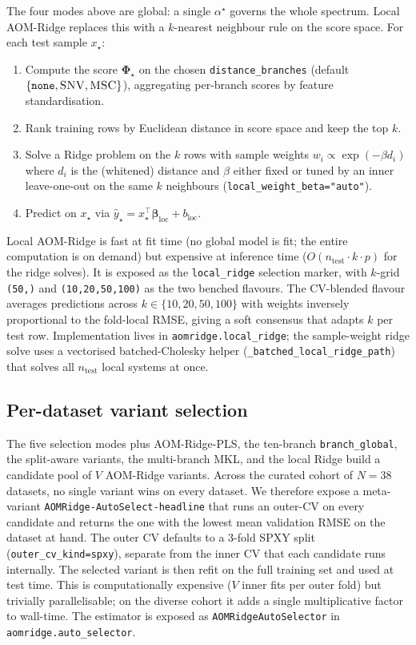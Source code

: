 \documentclass[11pt,a4paper]{article}
\newcommand{\Phimat}{\mathbf{\Phi}}
\newcommand{\SNV}{\textsc{SNV}\xspace}
\newcommand{\MSC}{\textsc{MSC}\xspace}
\begin{document}
The four modes above are global: a single $\alpha^\star$ governs the
whole spectrum. Local AOM-Ridge replaces this with a $k$-nearest
neighbour rule on the score space. For each test sample $x_\star$:
\begin{enumerate}[leftmargin=2em,itemsep=0pt]
  \item Compute the score $\Phimat_\star$ on the chosen
        \texttt{distance\_branches} (default
        $\{\texttt{none},\SNV,\MSC\}$), aggregating per-branch scores
        by feature standardisation.
  \item Rank training rows by Euclidean distance in score space and
        keep the top $k$.
  \item Solve a Ridge problem on the $k$ rows with sample weights
        $w_i\propto\exp(-\beta d_i)$ where $d_i$ is the (whitened)
        distance and $\beta$ either fixed or tuned by an inner
        leave-one-out on the same $k$ neighbours
        (\texttt{local\_weight\_beta="auto"}).
  \item Predict on $x_\star$ via
        $\hat{y}_\star=x_\star^\top\bm\beta_{\mathrm{loc}}+b_{\mathrm{loc}}$.
\end{enumerate}
Local AOM-Ridge is fast at fit time (no global model is fit; the
entire computation is on demand) but expensive at inference time
($O(n_\mathrm{test}\!\cdot\!k\!\cdot\!p)$ for the ridge solves). It
is exposed as the \texttt{local\_ridge} selection marker, with
$k$-grid \texttt{(50,)} and \texttt{(10,20,50,100)} as the two
benched flavours. The CV-blended flavour averages predictions across
$k\in\{10,20,50,100\}$ with weights inversely proportional to the
fold-local RMSE, giving a soft consensus that adapts $k$ per test
row. Implementation lives in \texttt{aomridge.local\_ridge}; the
sample-weight ridge solve uses a vectorised
batched-Cholesky helper (\texttt{\_batched\_local\_ridge\_path}) that
solves all $n_\mathrm{test}$ local systems at once.

\subsection{Per-dataset variant selection}\label{sec:method-autoselect}

The five selection modes plus AOM-Ridge-PLS, the ten-branch
\texttt{branch\_global}, the split-aware variants, the multi-branch
MKL, and the local Ridge build a candidate pool of $V$ AOM-Ridge
variants. Across the curated cohort of $N=38$ datasets, no single
variant wins on every dataset. We therefore expose a meta-variant
\texttt{AOMRidge-AutoSelect-headline} that runs an outer-CV on every
candidate and returns the one with the lowest mean validation RMSE
on the dataset at hand. The outer CV defaults to a 3-fold SPXY split
(\texttt{outer\_cv\_kind=spxy}), separate from the inner CV that each
candidate runs internally. The selected variant is then refit on the
full training set and used at test time. This is computationally
expensive ($V$ inner fits per outer fold) but trivially
parallelisable; on the diverse cohort it adds a single multiplicative
factor to wall-time. The estimator is exposed as
\texttt{AOMRidgeAutoSelector} in \texttt{aomridge.auto\_selector}.
\end{document}
